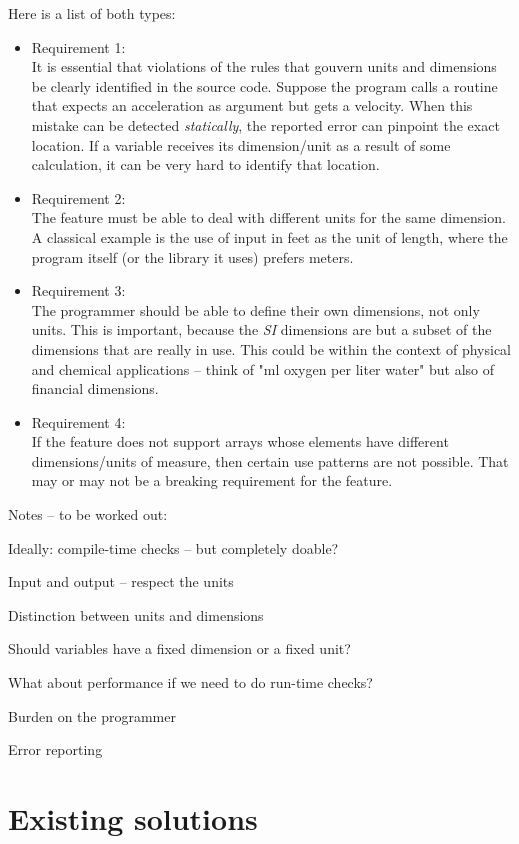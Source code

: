 \documentclass{article}
\begin{document}
Here is a list of both types:
\begin{itemize}
\item
Requirement 1: \\
It is essential that violations of the rules that gouvern units and dimensions be clearly identified in the
source code. Suppose the program calls a routine that expects an acceleration as argument but gets a velocity.
When this mistake can be detected \emph{statically}, the reported error can pinpoint the exact location. If
a variable receives its dimension/unit as a result of some calculation, it can be very hard to identify that
location.

\item
Requirement 2: \\
The feature must be able to deal with different units for the same dimension. A classical example is the use of
input in feet as the unit of length, where the program itself (or the library it uses) prefers meters.

\item
Requirement 3: \\
The programmer should be able to define their own dimensions, not only units. This is important, because the \emph{SI}
dimensions are but a subset of the dimensions that are really in use. This could be within the context of
physical and chemical applications -- think of "ml oxygen per liter water" but also of financial dimensions.

\item
Requirement 4: \\
If the feature does not support arrays whose elements have different dimensions/units of measure, then
certain use patterns are not possible. That may or may not be a breaking requirement for the feature.
\end{itemize}


Notes -- to be worked out:

Ideally: compile-time checks -- but completely doable?

Input and output -- respect the units

Distinction between units and dimensions

Should variables have a fixed dimension or a fixed unit?

What about performance if we need to do run-time checks?

Burden on the programmer

Error reporting


\section{Existing solutions}
\label{ExistingSolutions}
\end{document}
